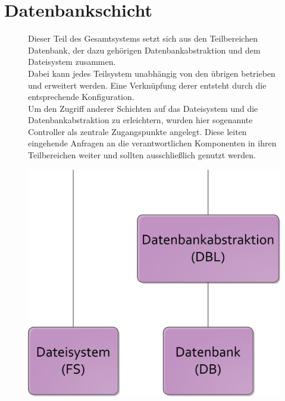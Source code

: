 \documentclass[10pt,a4paper,final,parskip]{scrartcl}
\begin{document}
\tableofcontents
\cleardoublepage


\section{Datenbankschicht}

\begin{figure}[hptb]
  \begin{minipage}[b][7.5cm][t]{.5\linewidth}
Dieser Teil des Gesamtsystems setzt sich aus den Teilbereichen Datenbank, der dazu gehörigen Datenbankabstraktion und dem Dateisystem zusammen.\\

Dabei kann jedes Teilsystem unabhängig von den übrigen betrieben und erweitert werden. Eine Verknüpfung derer entsteht durch die entsprechende Konfiguration.\\

Um den Zugriff anderer Schichten auf das Dateisystem und die Daten\-bank\-abstraktion zu erleichtern, wurden hier sogenannte Controller als zentrale Zugangspunkte angelegt. Diese leiten eingehende Anfragen an die verantwortlichen Komponenten in ihren Teilbereichen weiter und sollten ausschließlich genutzt werden. 
  \end{minipage}
  \begin{minipage}[b]{.5\linewidth}
    \centering
\includegraphics[scale=0.5]{DB-Schichten.png}
  \end{minipage}\hfill
\end{figure}
\end{document}
